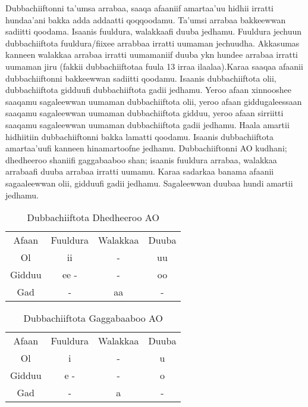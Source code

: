 \documentclass[11pt,b5paper]{book}
\begin{document}
\begin{itemize}
Dubbachiiftonni ta’umsa arrabaa, saaqa afaaniif amartaa’uu hidhii irratti hundaa’ani bakka adda addaatti qoqqoodamu.  Ta’umsi arrabaa bakkeewwan sadiitti qoodama. Isaanis  fuuldura, walakkaafi duuba jedhamu. Fuuldura jechuun  dubbachiiftota fuuldura/fiixee arrabbaa irratti uumaman  jechuudha. Akkasumas kanneen walakkaa arrabaa irratti  uumamaniif duuba ykn hundee arrabaa irratti uumaman jiru  (fakkii dubbachiiftotaa fuula 13 irraa ilaalaa).Karaa saaqaa afaanii dubbachiiftonni bakkeewwan sadiitti  qoodamu. Isaanis dubbachiiftota olii, dubbachiiftota gidduufi  dubbachiiftota gadii jedhamu. Yeroo afaan xinnooshee  saaqamu sagaleewwan uumaman dubbachiiftota olii, yeroo  afaan giddugaleessaan saaqamu sagaleewwan uumaman  dubbachiiftota gidduu, yeroo afaan sirriitti saaqamu  sagaleewwan uumaman dubbachiiftota gadii jedhamu. Haala  amartii hidhiitiin dubbachiiftonni bakka lamatti qoodamu.  Isaanis dubbachiiftota amartaa’uufi kanneen hinamartoofne  jedhamu. Dubbachiiftonni AO kudhani; dhedheeroo shaniifi gaggabaaboo  shan; isaanis fuuldura arrabaa, walakkaa arrabaafi duuba  arrabaa irratti uumamu. Karaa sadarkaa banama afaanii  sagaaleewwan olii, gidduufi gadii jedhamu. Sagaleewwan  duubaa hundi amartii jedhamu.

\begin{table}[H]
	\centering
\caption{Dubbachiiftota Dhedheeroo AO}
\begin{tabular}{c c c c}\\
  \hline\hline
  Afaan & Fuuldura & Walakkaa & Duuba\\
  Ol & ii & - & uu\\
  Gidduu & ee - & - & oo\\
  Gad & - & aa & -\\
  \hline\hline
  \end{tabular}
\end{table}

\begin{table}[H]
	\centering
	\caption{Dubbachiiftota Gaggabaaboo AO}	
	\begin{tabular}{c c c c} \\
		\hline\hline
		Afaan & Fuuldura & Walakkaa & Duuba\\
		Ol & i & - & u\\
		Gidduu & e - & - & o\\
		Gad & - & a & -\\
		\hline\hline
	\end{tabular}
\end{table}
  

\end{itemize}
\end{document}
